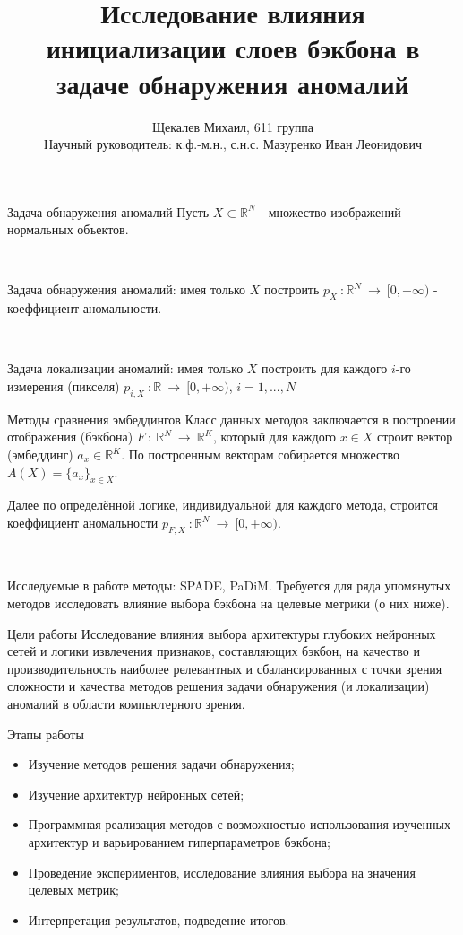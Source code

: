 \documentclass{beamer}
\title[Дипломная работа]{Исследование влияния инициализации слоев бэкбона в задаче обнаружения аномалий}
\author[Щекалёв Михаил]{Щекалев Михаил, 611 группа \\ Научный руководитель: к.ф.-м.н., с.н.с. Мазуренко Иван Леонидович}
\institute[]{МГУ имени М.В. Ломоносова \\ механико-математический факультет \\ кафедра математической теории интеллектуальных систем}
\begin{document}
	
\maketitle

\begin{frame}{Задача обнаружения аномалий}
	Пусть $X \subset \mathbb{R}^N$ - множество изображений нормальных объектов.
	
	\
	
	Задача обнаружения аномалий: имея только $X$ построить $p_X \ : \mathbb{R}^N \ \rightarrow \ [0, +\infty)$ - коеффициент аномальности.
	
	\
	
	Задача локализации аномалий: имея только $X$ построить для каждого $i$-го измерения (пикселя) $p_{i, X} \ : \mathbb{R} \ \rightarrow \ [0, +\infty)$, $i = 1,..., N$
\end{frame}

\begin{frame}{Методы сравнения эмбеддингов}
	Класс данных методов заключается в построении отображения (бэкбона) $F \ : \ \mathbb{R}^N \ \rightarrow \ \mathbb{R}^K$, который для каждого $x \in X$ строит вектор (эмбеддинг) $a_x \in \mathbb{R}^K$. По построенным векторам собирается множество $A(X) = \{a_x\}_{x \in X}$.
	
	Далее по определённой логике, индивидуальной для каждого метода, строится коеффициент аномальности $p_{F, X} \ : \mathbb{R}^N \ \rightarrow \ [0, +\infty)$.
	
	\
	
	Исследуемые в работе методы: SPADE, PaDiM. Требуется для ряда упомянутых методов исследовать влияние выбора бэкбона на целевые метрики (о них ниже).
\end{frame}

\begin{frame}{Цели работы}
	Исследование влияния выбора архитектуры глубоких нейронных сетей и логики извлечения признаков, составляющих бэкбон, на качество и производительность наиболее релевантных и сбалансированных с точки зрения сложности и качества методов решения задачи обнаружения (и локализации) аномалий в области компьютерного зрения.
\end{frame}

\begin{frame}{Этапы работы}
	\begin{itemize}
		\item Изучение методов решения задачи обнаружения;
		\item Изучение архитектур нейронных сетей;
		\item Программная реализация методов с возможностью использования изученных архитектур и варьированием гиперпараметров бэкбона;
		\item Проведение экспериментов, исследование влияния выбора на значения целевых метрик;
		\item Интерпретация результатов, подведение итогов.
	\end{itemize}
\end{frame}
\end{document}
